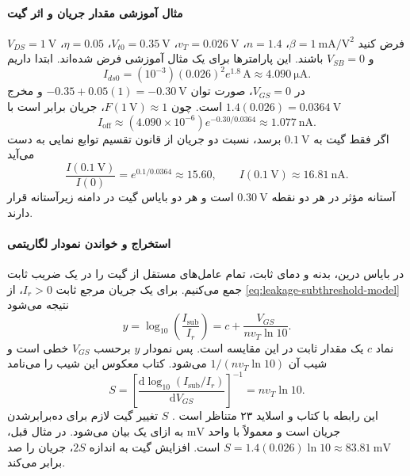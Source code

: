\paragraph*{مثال آموزشی مقدار جریان و اثر گیت}
فرض کنید \(\beta=\qty{1}{\milli\ampere\per\volt\squared}\)،
\(n=1.4\)، \(v_T=\qty{0.026}{\volt}\)،
\(V_{t0}=\qty{0.35}{\volt}\)، \(\eta=0.05\)،
\(V_{DS}=\qty{1}{\volt}\) و \(V_{SB}=0\) باشند.
این پارامترها برای یک مثال آموزشی فرض شده‌اند. ابتدا داریم
\begin{equation*}
 I_{ds0}=(10^{-3})(0.026)^2e^{1.8}\,\unit{\ampere}
 \approx\qty{4.090}{\micro\ampere}.
\end{equation*}
در \(V_{GS}=0\)، صورت توان
\(-0.35+0.05(1)=-\qty{0.30}{\volt}\) و مخرج
\(1.4(0.026)=\qty{0.0364}{\volt}\) است.
چون \(F(\qty{1}{\volt})\approx1\)، جریان برابر است با
\begin{equation*}
 I_{\mathrm{off}}\approx(4.090\times10^{-6})e^{-0.30/0.0364}
 \approx\qty{1.077}{\nano\ampere}.
\end{equation*}
اگر فقط گیت به \(\qty{0.1}{\volt}\) برسد، نسبت دو جریان از قانون
تقسیم توابع نمایی به دست می‌آید
\begin{equation*}
 \frac{I(\qty{0.1}{\volt})}{I(0)}
 =e^{0.1/0.0364}\approx15.60,
 \qquad I(\qty{0.1}{\volt})\approx\qty{16.81}{\nano\ampere}.
\end{equation*}
آستانه مؤثر در هر دو نقطه \(\qty{0.30}{\volt}\) است و هر دو بایاس
گیت در دامنه زیرآستانه قرار دارند.

\paragraph*{استخراج  و خواندن نمودار لگاریتمی}
در بایاس درین، بدنه و دمای ثابت، تمام عامل‌های مستقل از گیت را در یک
ضریب ثابت جمع می‌کنیم. برای یک جریان مرجع ثابت \(I_r>0\)، از
\eqref{eq:leakage-subthreshold-model} نتیجه می‌شود
\begin{equation}
 y=\log_{10}\!\left(\frac{I_{\mathrm{sub}}}{I_r}\right)
 =c+\frac{V_{GS}}{nv_T\ln10}.
 \label{eq:leakage-log-line}
\end{equation}
نماد \(c\) یک مقدار ثابت در این مقایسه است. پس نمودار \(y\) برحسب
\(V_{GS}\) خطی است و شیب آن \(1/(nv_T\ln10)\) می‌شود.
کتاب معکوس این شیب را  می‌نامد
\begin{equation}
 \boxed{S=\left[\frac{\mathrm{d}\log_{10}(I_{\mathrm{sub}}/I_r)}
 {\mathrm{d}V_{GS}}\right]^{-1}=nv_T\ln10}.
 \label{eq:leakage-subthreshold-slope}
\end{equation}
این رابطه با  کتاب و اسلاید ۲۳ متناظر است
\cite{weste,nonideal}. \(S\) تغییر گیت لازم برای ده‌برابرشدن جریان
است و معمولاً با واحد \(\unit{\milli\volt}\) به ازای یک
 بیان می‌شود. در مثال قبل،
\(S=1.4(0.026)\ln10\approx\qty{83.81}{\milli\volt}\) است.
افزایش گیت به اندازه \(2S\)، جریان را صد برابر می‌کند.


